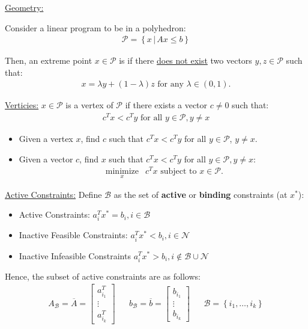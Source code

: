 \documentclass{article}
\newcommand{\sheader}[1]{\underline{#1:}}
\newcommand{\curly}[1]{\left\{#1\right\}}
\newcommand{\oper}[2]{\underset{#2}{\operatorname{#1}}}
\begin{document}
\sheader{Geometry}

Consider a linear program to be in a polyhedron:
\begin{align*}
    \mathcal{P} = \curly{x \,|\, Ax \leq b}
\end{align*}

Then, an extreme point $x\in \mathcal{P}$ is if there \underline{does not exist}
two vectors $y, z \in \mathcal{P}$ such that:
\begin{align*}
    x = \lambda y  + (1-\lambda)z \textrm{  for any  } \lambda \in (0, 1).
\end{align*}

\sheader{Verticies} $x\in \mathcal{P}$ is a vertex of $\mathcal{P}$ 
if there exists a vector $c \neq 0$ such that:
\begin{align*}
    c^Tx < c^Ty \textrm{  for all  } y \in \mathcal{P}, y\neq x
\end{align*}
\begin{itemize}
    \item Given a vertex $x$, find $c$ such that $c^Tx < c^Ty$ for all $y \in \mathcal{P}$, $y\neq x$.
    \item Given a vector $c$, find $x$ such that $c^Tx < c^Ty$ for all $y \in \mathcal{P}, y\neq x$:
    \begin{align*}
        \oper{minimize}{x} \,\,\,c^Tx \textrm{  subject to  } x \in \mathcal{P}.
    \end{align*}
\end{itemize}

\sheader{Active Constraints} Define $\mathcal{B}$ as the set of 
\textbf{active} or \textbf{binding} constraints (at $x^*$):
\begin{itemize}
    \item Active Constraints: $a_i^Tx^* = b_i, i \in \mathcal{B}$
    \item Inactive Feasible Constraints: $a_i^Tx^* < b_i, i \in \mathcal{N}$
    \item Inactive Infeasible Constraints $a_i^Tx^* > b_i, i \notin \mathcal{B} \cup \mathcal{N}$
\end{itemize}

Hence, the subset of active constraints are as follows:
\begin{align*}
    A_\mathcal{B} = \overline{A} = \begin{bmatrix}
        a_{i_1}^T\\
        \vdots\\
        a_{i_k}^T
    \end{bmatrix} &&
    b_\mathcal{B} = \overline{b} = \begin{bmatrix}
        b_{i_1}\\
        \vdots\\
        b_{i_k}
    \end{bmatrix} && 
    \mathcal{B} = \curly{i_1, \ldots, i_k}
\end{align*}
\end{document}
